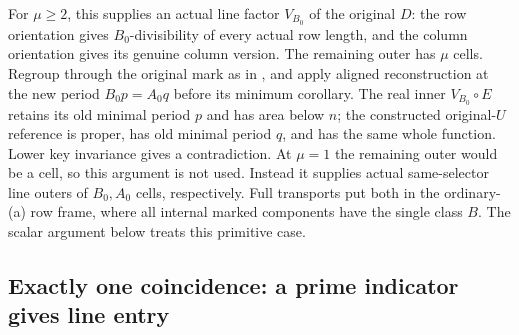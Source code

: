\documentclass[11pt,a4paper]{amsart}
\numberwithin{equation}{section}
\theoremstyle{plain}
\theoremstyle{definition}
\begin{document}
For \(\mu\ge2\), this supplies an actual line factor \(V_{B_0}\) of the
original \(D\): the row orientation gives \(B_0\)-divisibility of every actual
row length, and the column orientation gives its genuine column version.
The remaining outer has \(\mu\) cells.  Regroup through the original mark
as in , and apply aligned reconstruction at the new
period \(B_0p=A_0q\) before its minimum corollary.  The real inner
\(V_{B_0}\circ E\) retains its old minimal period \(p\) and has area below
\(n\); the constructed original-\(U\) reference is proper, has old minimal
period \(q\), and has the same whole function.  Lower key invariance gives
a contradiction.  At \(\mu=1\) the remaining outer would be a cell, so this
argument is not used.  Instead it supplies actual same-selector line
outers of \(B_0,A_0\) cells, respectively.  Full transports put both in the
ordinary-(a) row frame, where all internal marked components have the
single class \(B\).  The scalar argument below treats this primitive case.

\subsection{Exactly one coincidence: a prime indicator gives line entry}
\end{document}
